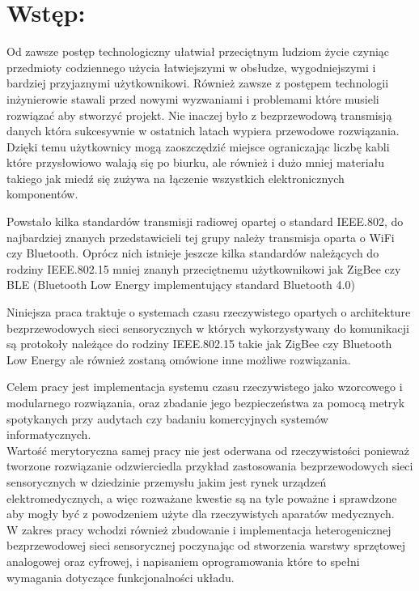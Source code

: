 \section{Wstęp:} 

\par 
\tab Od zawsze postęp technologiczny ułatwiał przeciętnym ludziom życie czyniąc przedmioty codziennego użycia łatwiejszymi w obsłudze, wygodniejszymi i bardziej przyjaznymi użytkownikowi. Również zawsze z postępem technologii inżynierowie stawali przed nowymi wyzwaniami i problemami które musieli rozwiązać aby stworzyć projekt. Nie inaczej było z bezprzewodową transmisją danych która sukcesywnie w ostatnich latach wypiera przewodowe rozwiązania. Dzięki temu użytkownicy mogą zaoszczędzić miejsce ograniczając liczbę kabli które przysłowiowo walają się po biurku, ale również i dużo mniej materiału takiego jak miedź się zużywa na łączenie wszystkich elektronicznych komponentów.
\\
\par Powstało kilka standardów transmisji radiowej opartej o standard IEEE.802, do najbardziej znanych przedstawicieli tej grupy należy transmisja oparta o WiFi czy Bluetooth. Oprócz nich istnieje jeszcze kilka standardów należących do rodziny IEEE.802.15 mniej znanyh przeciętnemu użytkownikowi jak ZigBee czy BLE (Bluetooth Low Energy implementujący standard Bluetooth 4.0)
\\
\par Niniejsza praca traktuje o systemach czasu rzeczywistego opartych o architekture bezprzewodowych sieci sensorycznych w których wykorzystywany do komunikacji są protokoły należące do rodziny IEEE.802.15 takie jak ZigBee czy Bluetooth Low Energy ale również zostaną omówione inne możliwe rozwiązania.
\\
\par Celem pracy jest implementacja systemu czasu rzeczywistego jako wzorcowego i modularnego rozwiązania, oraz zbadanie jego bezpieczeństwa za pomocą metryk spotykanych przy audytach czy badaniu komercyjnych systemów informatycznych. \\
\tab Wartość merytoryczna samej pracy nie jest oderwana od rzeczywistości ponieważ tworzone rozwiązanie odzwierciedla przykład zastosowania bezprzewodowych sieci sensorycznych w dziedzinie przemysłu jakim jest rynek urządzeń elektromedycznych, a więc rozważane kwestie są na tyle poważne i sprawdzone aby mogły być z powodzeniem użyte dla rzeczywistych aparatów medycznych. \\
\tab W zakres pracy wchodzi również zbudowanie i implementacja heterogenicznej bezprzewodowej sieci sensorycznej poczynając od stworzenia warstwy sprzętowej analogowej oraz cyfrowej, i napisaniem oprogramowania które to spełni wymagania dotyczące funkcjonalności układu.



\clearpage